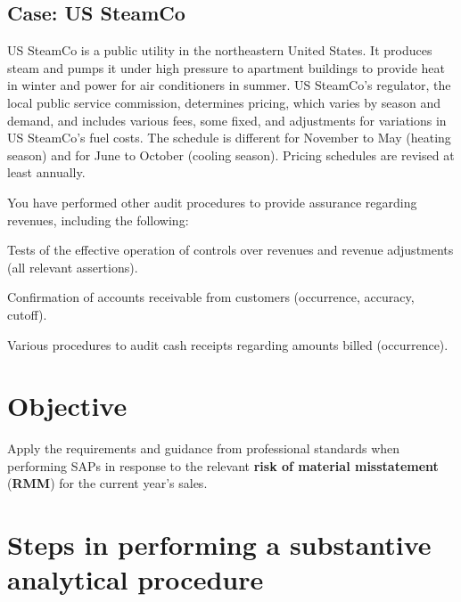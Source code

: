 \begin{mdframed}[hidealllines=true,backgroundcolor=gray!20]
\section*{Case: US SteamCo}
\label{case:ussteamco_ch06}

US SteamCo is a public utility in the northeastern United States. It produces steam and pumps it under high pressure to apartment buildings to provide heat in winter and power for air conditioners in summer. US SteamCo's regulator, the local public service commission, determines pricing, which varies by season and demand, and includes various fees, some fixed, and adjustments for variations in US SteamCo's fuel costs. The schedule is different for November to May (heating season) and for June to October (cooling season). Pricing schedules are revised at least annually.

You have performed other audit procedures to provide assurance regarding revenues, including the following:

\begin{compactitem}
\item Tests of the effective operation of controls over revenues and revenue adjustments (all relevant assertions).
\item Confirmation of accounts receivable from customers (occurrence, accuracy, cutoff).
\item Various procedures to audit cash receipts regarding amounts billed (occurrence).
\end{compactitem}

\end{mdframed}

\section*{Objective}
Apply the requirements and guidance from professional standards when performing SAPs in response to the relevant \textbf{risk of material misstatement} (\textbf{RMM}) for the current year's sales. 

\section{Steps in performing a substantive analytical procedure} %
\label{sec:steps_in_performing_a_substantive_analytical_procedure}

